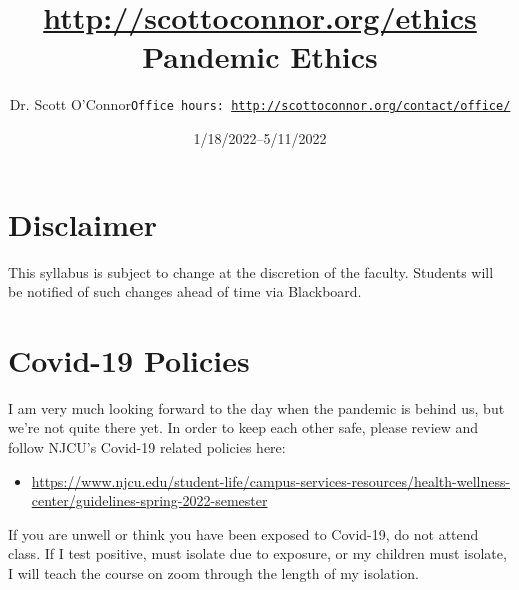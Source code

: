 \documentclass[article,oneside]{memoir}
\def\myauthor{Author}
\def\mytitle{Title}
\def\mycopyright{\myauthor}
\def\myweb{\href{http://scottoconnor.org/ethics}{http://scottoconnor.org/ethics}}
\def\myauthor{Dr. Scott O'Connor}
\def\mytitle{{\normalsize \myweb \newline} \HUGE Pandemic Ethics}
\begin{document}
\setsansfont[Mapping=tex-text]{Myriad Pro} 
\setmonofont[Mapping=tex-text,Scale=0.8]{Georgia} 

\def\ind{\hangindent=1 true cm\hangafter=1 \noindent}
\def\labelitemi{$\cdot$}


\title{\LARGE \mytitle}     
\author{\Large\myauthor \newline \footnotesize\texttt{\noindent Office hours: \href{http://scottoconnor.org/contact/office/}{http://scottoconnor.org/contact/office/}}}
\date{1/18/2022--5/11/2022}



\maketitle




%
%


\section{Disclaimer}
 This syllabus is subject to change at the discretion of the faculty. Students will be notified of such changes ahead of time via Blackboard. 

\section{Covid-19 Policies}
I am very much looking forward to the day when the pandemic is behind us, but we’re not quite there yet. In order to keep each other safe, please review and follow NJCU's Covid-19 related policies here:  
\begin{itemize}
\item \href{https://www.njcu.edu/student-life/campus-services-resources/health-wellness-center/guidelines-spring-2022-semester}{https://www.njcu.edu/student-life/campus-services-resources/health-wellness-center/guidelines-spring-2022-semester}
\end{itemize}
If you are unwell or think you have been exposed to Covid-19, do not attend class. If I test positive, must isolate due to exposure, or my children must isolate, I will teach the course on zoom through the length of my isolation. 
\end{document}
